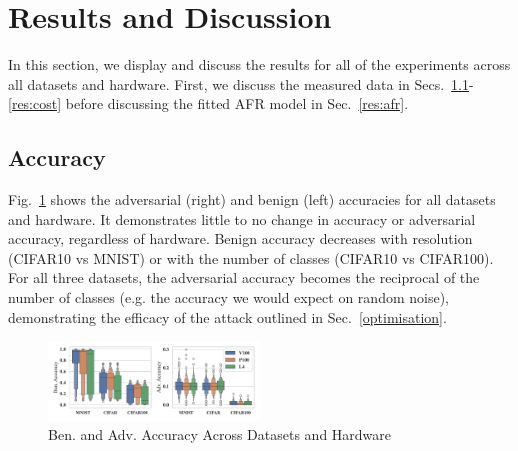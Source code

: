 \documentclass[journal]{IEEEtran}
\begin{document}
\section{Results and Discussion}
\label{results}

In this section, we display and discuss the results for all of the experiments across all datasets and hardware. First, we discuss the measured data in Secs.~\ref{res:acc}-\ref{res:cost} before discussing the fitted AFR model in Sec.~\ref{res:afr}.

\subsection{Accuracy}
\label{res:acc}
Fig.~\ref{fig:acc} shows the adversarial (right) and benign (left) accuracies for all datasets and hardware. It demonstrates little to no change in accuracy or adversarial accuracy, regardless of hardware. Benign accuracy decreases with resolution (CIFAR10 vs MNIST) or with the number of classes (CIFAR10 vs CIFAR100). For all three datasets, the adversarial accuracy becomes the reciprocal of the number of classes (e.g. the accuracy we would expect on random noise), demonstrating the efficacy of the attack outlined in Sec.~\ref{optimisation}.

\begin{figure}[h!]
    \centering
    \includegraphics[width=0.5\textwidth,clip]{plots/combined/acc.pdf}
    \caption{Ben. and Adv. Accuracy Across Datasets and Hardware}
    \label{fig:acc}
\end{figure}
\end{document}
